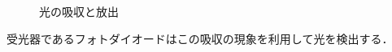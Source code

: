 \begin{figure}[t!]
\begin{center}
\caption{光の吸収と放出}
\label{fig:kyusyuhosya}
\end{center}
\end{figure}
受光器であるフォトダイオードはこの吸収の現象を利用して光を検出する．

